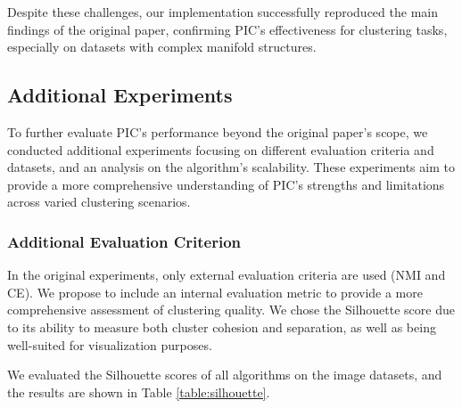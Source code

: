 Despite these challenges, our implementation successfully reproduced the main findings of the original paper, confirming PIC's effectiveness for clustering tasks, especially on datasets with complex manifold structures.

\subsection{Additional Experiments}
To further evaluate PIC's performance beyond the original paper's scope, we conducted additional experiments focusing on different evaluation criteria and datasets, and an analysis on the algorithm's scalability. These experiments aim to provide a more comprehensive understanding of PIC's strengths and limitations across varied clustering scenarios.

\subsubsection{Additional Evaluation Criterion}
In the original experiments, only external evaluation criteria are used (NMI and CE). We propose to include an internal evaluation metric to provide a more comprehensive assessment of clustering quality. We chose the Silhouette score due to its ability to measure both cluster cohesion and separation, as well as being well-suited for visualization purposes.

We evaluated the Silhouette scores of all algorithms on the image datasets, and the results are shown in Table \ref{table:silhouette}.

